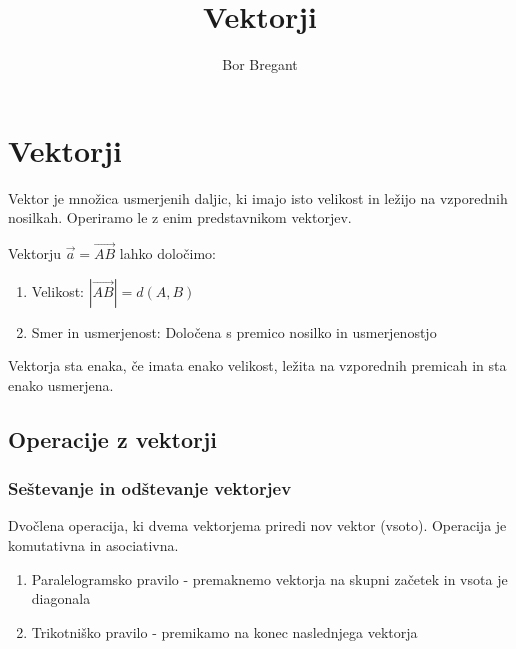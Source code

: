 \documentclass{article}
\title{Vektorji}
\author{Bor Bregant}
\date{\vspace{-5ex}}
\begin{document}
\maketitle

\section{Vektorji}

Vektor je množica usmerjenih daljic, ki imajo isto velikost in ležijo na vzporednih nosilkah. Operiramo le z enim predstavnikom vektorjev.

Vektorju $\vec{a}=\vec{AB}$ lahko določimo:

\begin{enumerate}[i]
    \item Velikost: $|\vec{AB}|=d(A,B)$
    \item Smer in usmerjenost: Določena s premico nosilko in usmerjenostjo
\end{enumerate}

Vektorja sta enaka, če imata enako velikost, ležita na vzporednih premicah in sta enako usmerjena.

\subsection*{Operacije z vektorji}

\subsubsection*{Seštevanje in odštevanje vektorjev}

Dvočlena operacija, ki dvema vektorjema priredi nov vektor (vsoto). Operacija je komutativna in asociativna.

\begin{enumerate}[i]
    \item Paralelogramsko pravilo - premaknemo vektorja na skupni začetek in vsota je diagonala
    \item Trikotniško pravilo - premikamo na konec naslednjega vektorja
\end{enumerate}
\end{document}
